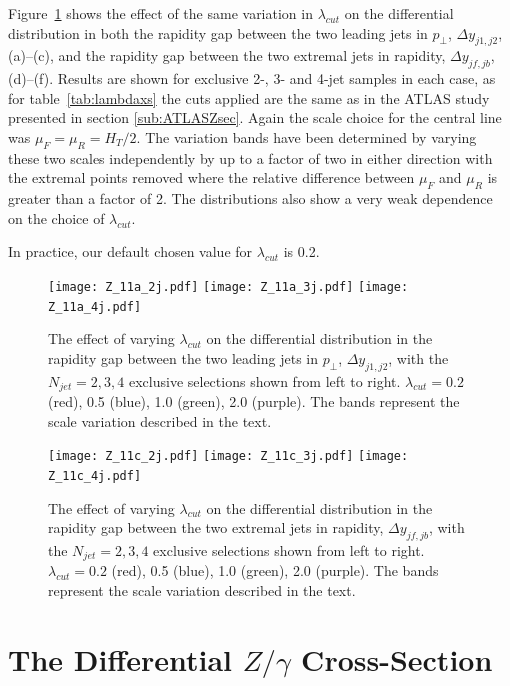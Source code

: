 	Figure~\ref{fig:lambdadist} shows the effect of the same variation in $\lambda_{cut}$ on the
	differential distribution in both the rapidity gap between the two leading jets in $p_\perp$,
	$\Delta y_{j1, j2}$, (a)--(c), and the rapidity gap between the two extremal jets in
	rapidity, $\Delta y_{jf, jb}$, (d)--(f).  Results are shown for exclusive 2-, 3-
	and 4-jet samples in each case, as for table~\ref{tab:lambdaxs} the cuts applied are the
	same as in the ATLAS study presented in section \ref{sub:ATLASZsec}.
	Again the scale choice for the central line was $\mu_F=\mu_R=H_T/2$.  The variation bands
	have been determined by varying these two scales independently by up to a factor of two
	in either direction with the extremal points removed where the relative difference between
	$\mu_F$ and $\mu_R$ is greater than a factor of 2.  The distributions also show a very weak
	dependence on the choice of $\lambda_{cut}$.

	In practice, our default chosen value for $\lambda_{cut}$ is 0.2.

	\begin{figure}[hbt!]
		\centering
		\texttt{[image: Z\_11a\_2j.pdf]}\hfill
		\texttt{[image: Z\_11a\_3j.pdf]}\hfill
		\texttt{[image: Z\_11a\_4j.pdf]}
		\caption{The effect of varying $\lambda_{cut}$ on the differential distribution
		in the rapidity gap between the two leading jets in $p_\perp$, $\Delta y_{j1, j2}$,
		with the $N_{jet}=2,3,4$ exclusive selections shown from left to right.
		$\lambda_{cut}=0.2$ (red), 0.5 (blue), 1.0 (green), 2.0 (purple).
		The bands represent the scale variation described in the text.}
		\label{fig:lambdadist}
	\end{figure}

	\begin{figure}[hbt!]
		\centering
		\texttt{[image: Z\_11c\_2j.pdf]}\hfill
		\texttt{[image: Z\_11c\_3j.pdf]}\hfill
		\texttt{[image: Z\_11c\_4j.pdf]}
		\caption{The effect of varying $\lambda_{cut}$ on the differential distribution
		in the rapidity gap between the two extremal jets in rapidity, $\Delta y_{jf, jb}$,
		with the $N_{jet}=2,3,4$ exclusive selections shown from left to right.
		$\lambda_{cut}=0.2$ (red), 0.5 (blue), 1.0 (green), 2.0 (purple).
		The bands represent the scale variation described in the text.}
		\label{fig:lambdadistdy}
	\end{figure}

\section{The Differential ${Z/\gamma}$ Cross-Section}


